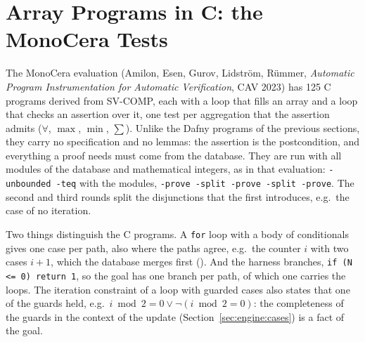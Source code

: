 \section{Array Programs in C: the MonoCera Tests}\label{sec:monocera}

The MonoCera evaluation (Amilon, Esen, Gurov, Lidström, Rümmer, \emph{Automatic Program Instrumentation for
Automatic Verification}, CAV 2023) has 125 C programs derived from SV-COMP, each with a loop that fills an array and
a loop that checks an assertion over it, one test per aggregation that the assertion admits ($\forall$, $\max$,
$\min$, $\sum$). Unlike the Dafny programs of the previous sections, they carry no specification and no lemmas: the
assertion is the postcondition, and everything a proof needs must come from the database. They are run with all
modules of the database and mathematical integers, as in that evaluation:
\texttt{-unbounded -teq} with the modules, \texttt{-prove -split -prove -split -prove}. The second and third rounds
split the disjunctions that the first introduces, e.g.\ the case of no iteration.



Two things distinguish the C programs. A \texttt{for} loop with a body of conditionals gives one case per path, also
where the paths agree, e.g.\ the counter $i$ with two cases $i + 1$, which the database merges first
(). And the harness branches, \texttt{if (N <= 0) return 1}, so the goal has one
branch per path, of which one carries the loops. The iteration constraint of a loop with guarded cases also states
that one of the guards held, e.g.\ $i \bmod 2 = 0 \vee \neg(i \bmod 2 = 0)$: the completeness of the guards in the
context of the update (Section~\ref{sec:engine:cases}) is a fact of the goal.

